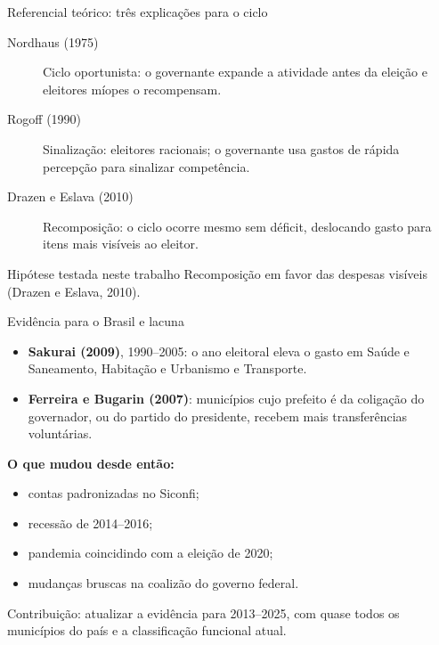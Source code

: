 \documentclass[aspectratio=169,9pt]{beamer}
\begin{document}
\begin{frame}{Referencial teórico: três explicações para o ciclo}
  \begin{description}
    \item[Nordhaus (1975)] Ciclo \alert{oportunista}: o governante expande a atividade antes da eleição e eleitores míopes o recompensam.
    \item[Rogoff (1990)] \alert{Sinalização}: eleitores racionais; o governante usa gastos de rápida percepção para sinalizar competência.
    \item[Drazen e Eslava (2010)] \alert{Recomposição}: o ciclo ocorre mesmo sem déficit, deslocando gasto para itens mais visíveis ao eleitor.
  \end{description}
  \vspace{1em}
  \begin{alertblock}{Hipótese testada neste trabalho}
    Recomposição em favor das despesas visíveis (Drazen e Eslava, 2010).
  \end{alertblock}
\end{frame}

\begin{frame}{Evidência para o Brasil e lacuna}
  \begin{itemize}
    \item \textbf{Sakurai (2009)}, 1990--2005: o ano eleitoral eleva o gasto em Saúde e Saneamento, Habitação e Urbanismo e Transporte.
    \item \textbf{Ferreira e Bugarin (2007)}: municípios cujo prefeito é da coligação do governador, ou do partido do presidente, recebem mais transferências voluntárias.
  \end{itemize}
  \vspace{0.5em}
  \textbf{O que mudou desde então:}
  \begin{itemize}
    \item contas padronizadas no Siconfi;
    \item recessão de 2014--2016;
    \item pandemia coincidindo com a eleição de 2020;
    \item mudanças bruscas na coalizão do governo federal.
  \end{itemize}
  \vspace{0.5em}
  \alert{Contribuição:} atualizar a evidência para 2013--2025, com quase todos os municípios do país e a classificação funcional atual.
\end{frame}
\end{document}
